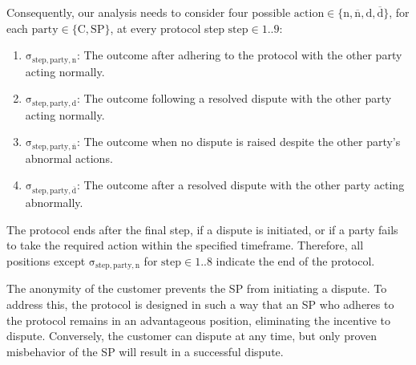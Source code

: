 \documentclass[pdftex,twocolumn,epjc3]{svjour3}
\newcommand{\normal}{\mathrm{n}}
\newcommand{\dispute}{\mathrm{d}}
\newcommand{\abnormal}{\overline{\mathrm{n}}}
\newcommand{\abdispute}{\overline{\mathrm{d}}}
\begin{document}
\begin{sloppypar}
Consequently, our analysis needs to consider four possible $\mathrm{action} \in \{ \normal{}, \abnormal{}, \dispute{}, \abdispute{} \}$, for each $\mathrm{party \in \{C, SP\} }$, at every protocol step $\mathrm{step \in 1..9}$:
\end{sloppypar}

\begin{enumerate}
\item $\mathrm{\sigma_{step,party,\normal{}}}$: The outcome after adhering to the protocol with the other party acting normally.
\item $\mathrm{\sigma_{step,party,\dispute{}}}$: The outcome following a resolved dispute with the other party acting normally.
\item $\mathrm{\sigma_{step,party,\abnormal{}}}$: The outcome when no dispute is raised despite the other party's abnormal actions.
\item $\mathrm{\sigma_{step,party,\abdispute{}}}$: The outcome after a resolved dispute with the other party acting abnormally.
\end{enumerate}

\begin{sloppypar}
The protocol ends after the final step, if a dispute is initiated, or if a party fails to take the required action within the specified timeframe. Therefore, all positions except $\mathrm{\sigma_{step, party, n}}$ for $\mathrm{step} \in 1..8$ indicate the end of the protocol.
\end{sloppypar}

The anonymity of the customer prevents the SP from initiating a dispute. To address this, the protocol is designed in such a way that an SP who adheres to the protocol remains in an advantageous position, eliminating the incentive to dispute. Conversely, the customer can dispute at any time, but only proven misbehavior of the SP will result in a successful dispute.
\end{document}
